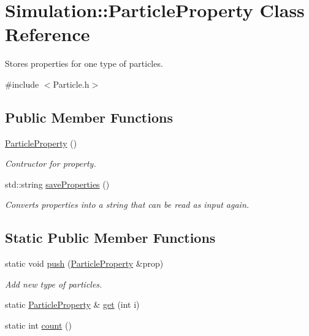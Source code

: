 \hypertarget{classSimulation_1_1ParticleProperty}{\section{Simulation\-:\-:Particle\-Property Class Reference}
\label{classSimulation_1_1ParticleProperty}
}


Stores properties for one type of particles.  




{\ttfamily \#include $<$Particle.\-h$>$}

\subsection*{Public Member Functions}
\begin{DoxyCompactItemize}
\item 
\hyperlink{classSimulation_1_1ParticleProperty_a6a931af7787ba8bb7ee3bba88cc875e6}{Particle\-Property} ()
\begin{DoxyCompactList}\small\item\em Contructor for property. \end{DoxyCompactList}\item 
std\-::string \hyperlink{classSimulation_1_1ParticleProperty_a636944dd6fa9f25fb39b7dc871dc51e4}{save\-Properties} ()
\begin{DoxyCompactList}\small\item\em Converts properties into a string that can be read as input again. \end{DoxyCompactList}\end{DoxyCompactItemize}
\subsection*{Static Public Member Functions}
\begin{DoxyCompactItemize}
\item 
static void \hyperlink{classSimulation_1_1ParticleProperty_af725f9c9d30cb1b64fe669a7842de12c}{push} (\hyperlink{classSimulation_1_1ParticleProperty}{Particle\-Property} \&prop)
\begin{DoxyCompactList}\small\item\em Add new type of particles. \end{DoxyCompactList}\item 
static \hyperlink{classSimulation_1_1ParticleProperty}{Particle\-Property} \& \hyperlink{classSimulation_1_1ParticleProperty_acab370093ec1ad31402b68aaf386dad2}{get} (int i)
\item 
static int \hyperlink{classSimulation_1_1ParticleProperty_a000e6d8061005aa0352ad66d97e41efc}{count} ()
\end{DoxyCompactItemize}
